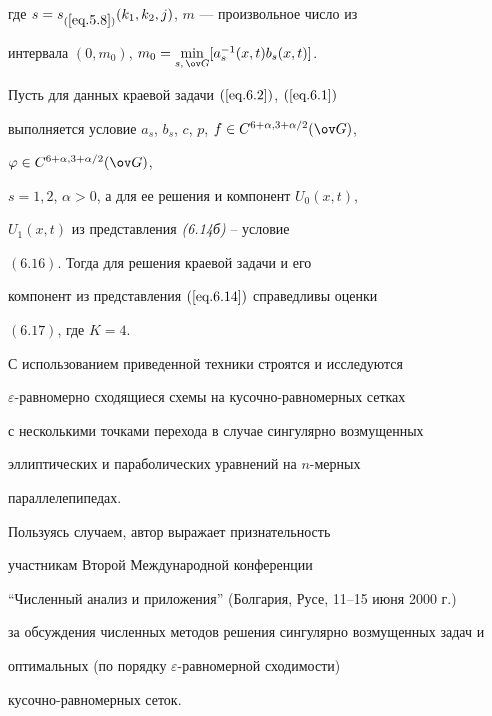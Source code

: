 где $s=s_{(\ref{eq.5.8})}(k_1,k_2,j)$, $m$ --- произвольное число из


интервала $(0, m_0)$, $m_0=\min\limits_{s,\,\ov G}[a^{-1}_s(x,t)b_s(x,t)]$.





\begin{thms} \label{t.6.2}


Пусть для данных краевой задачи $(\ref{eq.6.2})$, $(\ref{eq.6.1})$


выполняется условие $a_s$, $b_s$, $c$, $p$, $f\in


C^{6+\alpha,3+\alpha/2}(\ov G)$,


$\varphi\in C^{6+\alpha, 3+\alpha/2}(\ov G)$,


$s=1,2$, $\alpha>0$, а для ее решения и компонент $U_0(x,t)$,


$U_1(x,t)$ из представления {\em (6.14б)} -- условие


$(6.16)$. Тогда для решения краевой задачи и его


компонент из представления $(\ref{eq.6.14})$ справедливы оценки


$(6.17)$, где $K=4$.


\end{thms}





С использованием приведенной техники строятся и исследуются


$\varepsilon$-равномерно сходящиеся схемы на кусочно-равномерных сетках


с несколькими точками перехода в случае сингулярно возмущенных


эллиптических и параболических уравнений на $n$-мерных


параллелепипедах.





\medskip


Пользуясь случаем, автор выражает признательность


участникам Второй Международной конференции


``Численный анализ и приложения'' (Болгария, Русе, 11--15 июня 2000 г.)


за обсуждения численных методов решения сингулярно возмущенных задач и


оптимальных (по порядку $\varepsilon$-равномерной сходимости)


кусочно-равномерных сеток.\\[1ex]








